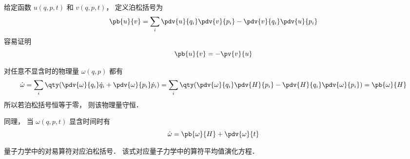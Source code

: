 
\begin{issues}
\issueDraft
\end{issues}


给定函数 $u(q, p, t)$ 和 $v(q, p, t)$， 定义泊松括号为
\begin{equation}
\pb{u}{v} = \sum_i \pdv{u}{q_i}\pdv{v}{p_i} - \pdv{v}{q_i}\pdv{u}{p_i}
\end{equation}
容易证明
\begin{equation}
\pb{u}{v} = -\pv{v}{u}
\end{equation}

对任意不显含时的物理量 $\omega (q,p)$ 都有
\begin{equation}\label{poison_eq1}
\dot \omega  = \sum_i \qty(\pdv{\omega}{q_i} \dot q_i + \pdv{\omega}{p_i} \dot p_i)
= \sum_i \qty(\pdv{\omega}{q_i} \pdv{H}{p_i} - \pdv{H}{q_i} \pdv{\omega}{p_i})
= \pb{\omega}{H} 
\end{equation}
所以若泊松括号恒等于零， 则该物理量守恒．

同理， 当 $\omega (q,p,t)$ 显含时间时有
\begin{equation}
\dot \omega  =  \pb{\omega}{H}  + \pdv{\omega}{t}
\end{equation}


量子力学中的对易算符对应泊松括号． 该式对应量子力学中的算符平均值演化方程．
